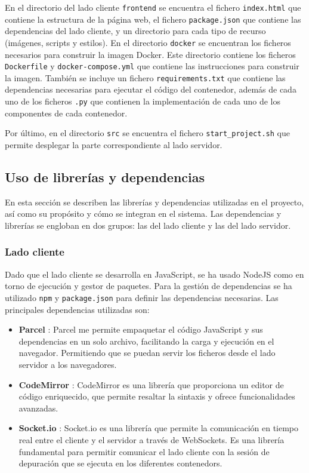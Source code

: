 En el directorio del lado cliente \texttt{frontend} se encuentra el fichero \texttt{index.html} que contiene la estructura de la página web, el fichero \texttt{package.json} que contiene las dependencias del lado cliente, y un directorio para cada tipo de recurso (imágenes, scripts y estilos). 
En el directorio \texttt{docker} se encuentran los ficheros necesarios para construir la \gls{imagen Docker}. Este directorio contiene los ficheros \texttt{Dockerfile} y \texttt{docker-compose.yml} que contiene las instrucciones para construir la imagen. También se incluye un fichero \texttt{requirements.txt} que contiene las dependencias necesarias para ejecutar el código del \gls{contenedor}, además de cada uno de los ficheros \texttt{.py} que contienen la implementación de cada uno de los componentes de cada \gls{contenedor}.  

Por último, en el directorio \texttt{src} se encuentra el fichero \texttt{start\_project.sh} que permite desplegar la parte correspondiente al lado servidor. 

\subsection{Uso de librerías y dependencias} \label{subsec:uso_librerias_dependencias}

En esta sección se describen las librerías y dependencias utilizadas en el proyecto, así como su propósito y cómo se integran en el sistema. Las dependencias y librerías se engloban en dos grupos: las del lado cliente y las del lado servidor.

\subsubsection{Lado cliente}
Dado que el lado cliente se desarrolla en JavaScript, se ha usado NodeJS como en torno de ejecución y gestor de paquetes. Para la gestión de dependencias se ha utilizado \texttt{npm} y \texttt{package.json} para definir las dependencias necesarias.
Las principales dependencias utilizadas son:
\begin{itemize}
    \item \textbf{Parcel} \cite{parcel}: Parcel me permite empaquetar el código JavaScript y sus dependencias en un solo archivo, facilitando la carga y ejecución en el navegador. Permitiendo que se puedan servir los ficheros desde el lado servidor a los navegadores.
    \item \textbf{CodeMirror} \cite{codemirror}: CodeMirror es una librería que proporciona un editor de código enriquecido, que permite resaltar la sintaxis y ofrece funcionalidades avanzadas.
    \item \textbf{Socket.io} \cite{socket.io}: Socket.io es una librería que permite la comunicación en tiempo real entre el cliente y el servidor a través de WebSockets. Es una librería fundamental para permitir comunicar el lado cliente con la sesión de depuración que se ejecuta en los diferentes \glspl{contenedor}.
\end{itemize}

